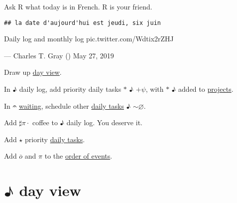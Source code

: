 \documentclass[]{book}
\newenvironment{Shaded}{\begin{snugshade}}{\end{snugshade}}
\newcommand{\CommentTok}[1]{\textcolor[rgb]{0.56,0.35,0.01}{\textit{#1}}}
\newcommand{\DataTypeTok}[1]{\textcolor[rgb]{0.13,0.29,0.53}{#1}}
\newcommand{\KeywordTok}[1]{\textcolor[rgb]{0.13,0.29,0.53}{\textbf{#1}}}
\newcommand{\NormalTok}[1]{#1}
\newcommand{\OperatorTok}[1]{\textcolor[rgb]{0.81,0.36,0.00}{\textbf{#1}}}
\newcommand{\StringTok}[1]{\textcolor[rgb]{0.31,0.60,0.02}{#1}}
\begin{document}
Ask R what today is in French. R is your friend.

\begin{Shaded}
\end{Shaded}

\begin{verbatim}
## la date d'aujourd'hui est jeudi, six juin
\end{verbatim}

Daily log and monthly log pic.twitter.com/Wdtix2rZHJ

--- Charles T. Gray (\citet{cantabile}) May 27, 2019

Draw up \protect\hyperlink{dayview:day-view}{day view}.

In ♪ daily log, add priority daily tasks \(*\) ♪ \(+ \psi\), with \(*\) ♪ added to \protect\hyperlink{dayview:day-view}{projects}.

In 𝄐 \protect\hyperlink{dayview:day-view}{waiting}, schedule other \protect\hyperlink{daily-tasks}{daily tasks} ♪ \(\sim \varnothing\).

Add \(\sharp \pi \cdot\) coffee to ♪ daily log. You deserve it.

Add \(\star\) priority \protect\hyperlink{daily-tasks}{daily tasks}.

Add \protect\hyperlink{review}{\(\overline o\)} and \(\pi\) to the \protect\hyperlink{dayview:order-of-events}{order of events}.

\hypertarget{dayview:day-view}{%
\section{♪ day view}\label{dayview:day-view}}

\begin{Shaded}
\end{Shaded}
\end{document}
